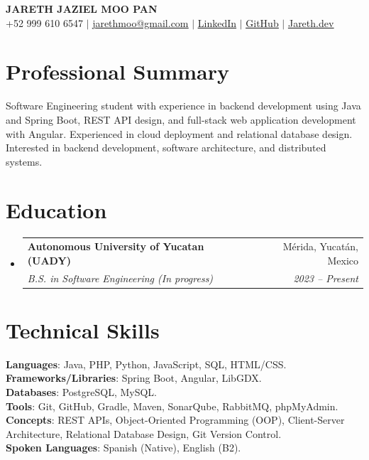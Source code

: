 \documentclass[letterpaper,12pt]{article}
\makeatletter
\newcommand{\resumeSubheading}[4]{
  \vspace{-2pt}\item
    \begin{tabular*}{0.97\textwidth}[t]{l@{\extracolsep{\fill}}r}
      \textbf{#1} & #2 \\
      \textit{\small#3} & \textit{\small #4} \\
    \end{tabular*}\vspace{-7pt}
}
\newcommand{\resumeSubHeadingListStart}{\begin{itemize}[leftmargin=0.15in, label={}]}
\newcommand{\resumeSubHeadingListEnd}{\end{itemize}}
\newcommand{\cvlink}[2]{\href{#1}{\underline{#2}}}
\makeatother
\begin{document}
\begin{center}
    \textbf{\Huge \scshape JARETH JAZIEL MOO PAN} \\ \vspace{5pt}
    \small +52 999 610 6547 $|$ 
    \cvlink{mailto:jarethmoo@gmail.com}{jarethmoo@gmail.com} $|$ 
    \cvlink{https://linkedin.com/in/jareth-moo-6b8500271}{LinkedIn} $|$
    \cvlink{https://github.com/JarethJaziel}{GitHub} $|$
    \cvlink{https://jarethjaziel.github.io/Jareth.dev/}{Jareth.dev}
\end{center}

\section{Professional Summary}
Software Engineering student with experience in backend development using Java and Spring Boot, REST API design, and full-stack web application development with Angular. Experienced in cloud deployment and relational database design. Interested in backend development, software architecture, and distributed systems.

\section{Education}
  \resumeSubHeadingListStart
    \resumeSubheading
      {Autonomous University of Yucatan (UADY)}{Mérida, Yucatán, Mexico}
      {B.S. in Software Engineering (In progress)}{2023 -- Present}
  \resumeSubHeadingListEnd

\section{Technical Skills}
 \begin{itemize}[leftmargin=0.15in, label={}]
    \small{\item{
     \textbf{Languages}{: Java, PHP, Python, JavaScript, SQL, HTML/CSS.}\\
     \textbf{Frameworks/Libraries}{: Spring Boot, Angular, LibGDX.}\\
     \textbf{Databases}{: PostgreSQL, MySQL.}\\
     \textbf{Tools}{: Git, GitHub, Gradle, Maven, SonarQube, RabbitMQ, phpMyAdmin.}\\
     \textbf{Concepts}{: REST APIs, Object-Oriented Programming (OOP), Client-Server Architecture, Relational Database Design, Git Version Control.}\\
     \textbf{Spoken Languages}{: Spanish (Native), English (B2).}
    }}
 \end{itemize}
\end{document}
